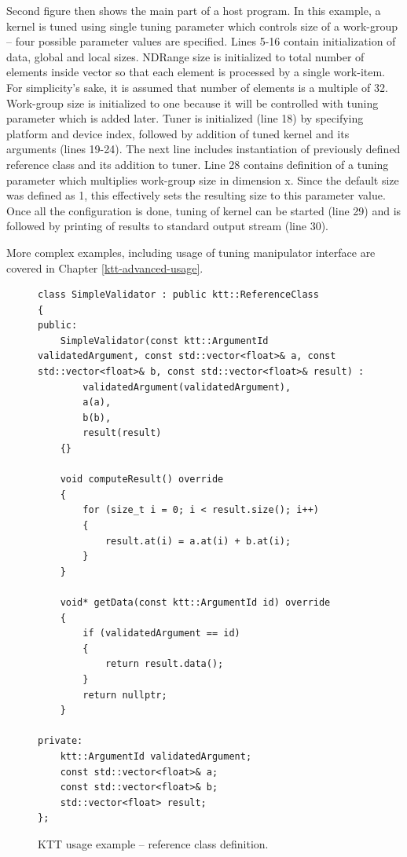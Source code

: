 \documentclass
[
    digital, %
    oneside, %
    table, %
    nolof, %
    nolot, %
    nocover %
]{fithesis3}
\begin{document}
Second figure then shows the main part of a host program. In this example, a kernel is tuned using single tuning parameter which controls size of a
work-group -- four possible parameter values are specified. Lines 5-16 contain initialization of data, global and local sizes. NDRange size is
initialized to total number of elements inside vector so that each element is processed by a single work-item. For simplicity's sake, it is assumed that
number of elements is a multiple of 32. Work-group size is initialized to one because it will be controlled with tuning parameter which is added later.
Tuner is initialized (line 18) by specifying platform and device index, followed by addition of tuned kernel and its arguments (lines 19-24). The next
line includes instantiation of previously defined reference class and its addition to tuner. Line 28 contains definition of a tuning parameter which
multiplies work-group size in dimension x. Since the default size was defined as 1, this effectively sets the resulting size to this parameter value.
Once all the configuration is done, tuning of kernel can be started (line 29) and is followed by printing of results to standard output stream (line 30).

More complex examples, including usage of tuning manipulator interface are covered in Chapter \ref{ktt-advanced-usage}.

\begin{figure}
\footnotesize
\begin{adjustwidth}{-1cm}{-1cm}
\begin{lstlisting}
class SimpleValidator : public ktt::ReferenceClass
{
public:
    SimpleValidator(const ktt::ArgumentId validatedArgument, const std::vector<float>& a, const std::vector<float>& b, const std::vector<float>& result) :
        validatedArgument(validatedArgument),
        a(a),
        b(b),
        result(result)
    {}
    
    void computeResult() override
    {
        for (size_t i = 0; i < result.size(); i++)
        {
            result.at(i) = a.at(i) + b.at(i);
        }
    }
    
    void* getData(const ktt::ArgumentId id) override
    {
        if (validatedArgument == id)
        {
            return result.data();
        }
        return nullptr;
    }
    
private:
    ktt::ArgumentId validatedArgument;
    const std::vector<float>& a;
    const std::vector<float>& b;
    std::vector<float> result;
};
\end{lstlisting}
\caption{KTT usage example -- reference class definition.}
\label{ktt-api-usage-reference}
\end{adjustwidth}
\end{figure}
\end{document}
